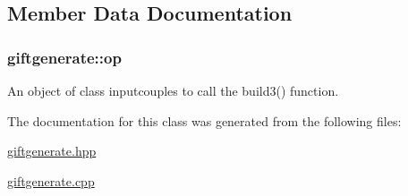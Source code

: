 \subsection{Member Data Documentation}
\hypertarget{classgiftgenerate_aab985b2eb48081002c3d8766bfcd05ac}{
\subsubsection[{op}]{ giftgenerate\-::op}}\label{classgiftgenerate_aab985b2eb48081002c3d8766bfcd05ac}


An object of class inputcouples to call the build3() function. 



The documentation for this class was generated from the following files\-:\begin{DoxyCompactItemize}
\item 
\hyperlink{giftgenerate_8hpp}{giftgenerate.\-hpp}\item 
\hyperlink{giftgenerate_8cpp}{giftgenerate.\-cpp}\end{DoxyCompactItemize}
